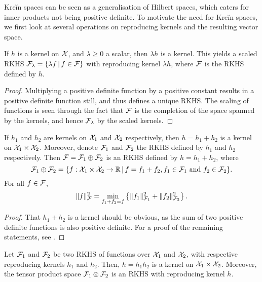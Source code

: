 Kreĭn spaces can be seen as a generalisation of Hilbert spaces, which caters for inner products not being positive definite.
To motivate the need for Kreĭn spaces, we first look at several operations on reproducing kernels and the resulting vector space.

\begin{lemma}\label{thm:scalingkernels}
  If $h$ is a kernel on ${\mathcal X}$, and $\lambda \geq 0$ a scalar, then $\lambda h$ is a kernel.
  This yields a scaled RKHS ${\mathcal F}_\lambda = \{\lambda f \,|\, f \in {\mathcal F} \}$ with reproducing kernel $\lambda h$, where ${\mathcal F}$ is the RKHS defined by $h$.
\end{lemma}

\begin{proof}
  Multiplying a positive definite function by a positive constant results in a positive definite function still, and thus defines a unique RKHS.
  The scaling of functions is seen through the fact that ${\mathcal F}$ is the completion of the space spanned by the kernels, and hence ${\mathcal F}_\lambda$ by the scaled kernels.
\end{proof}

\begin{lemma}
  If $h_1$ and $h_2$ are kernels on ${\mathcal X}_1$ and ${\mathcal X}_2$ respectively, then $h = h_1 + h_2$ is a kernel on ${\mathcal X}_1 \times {\mathcal X}_2$.
  Moreover, denote ${\mathcal F}_1$ and ${\mathcal F}_2$ the RKHS defined by $h_1$ and $h_2$ respectively.
  Then ${\mathcal F} = {\mathcal F}_1 \oplus {\mathcal F}_2$ is an RKHS defined by $h = h_1 + h_2$, where
  \[
    {\mathcal F}_1 \oplus {\mathcal F}_2 = \{ f:{\mathcal X}_1\times{\mathcal X}_2 \to\mathbb{R} \,|\, f = f_1 + f_2, f_1\in{\mathcal F}_1 \text{ and } f_2\in{\mathcal F}_2 \}.
  \]
  For all $f\in{\mathcal F}$,
  \[
    \lVert f\rVert_{\mathcal F}^2 = \min_{f_1+f_2=f} \left\{ \lVert f_1\rVert_{{\mathcal F}_1}^2 + \lVert f_2\rVert_{{\mathcal F}_2}^2 \right\}.
  \]
\end{lemma}

\begin{proof}
  That $h_1+h_2$ is a kernel should be obvious, as the sum of two positive definite functions is also positive definite.
  For a proof of the remaining statements, see \citet[Theorem 5]{berlinet2011reproducing}.
\end{proof}

\begin{lemma}\label{thm:prodkernels}
  Let ${\mathcal F}_1$ and ${\mathcal F}_2$ be two RKHS of functions over ${\mathcal X}_1$ and ${\mathcal X}_2$, with respective reproducing kernels $h_1$ and $h_2$.
  Then, $h = h_1 h_2$ is a kernel on ${\mathcal X}_1 \times {\mathcal X}_2$.
  Moreover, the tensor product space ${\mathcal F}_1 \otimes {\mathcal F}_2$ is an RKHS with reproducing kernel $h$.
\end{lemma}

